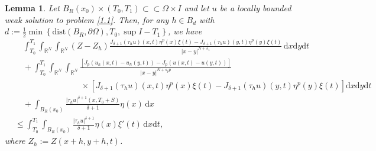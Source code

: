 \documentclass[reqno,10pt]{amsart}
\numberwithin{equation}{section}
\newtheorem{lemma}[theorem]{Lemma}
\begin{document}
\begin{lemma}
	\label{lem3}
	Let $B_R(x_0)\times(T_0,T_1)\subset\subset\Omega\times I$ and let $u$ be a locally bounded weak solution to problem \eqref{1.1}. Then, for any $h\in B_d$ with $d:=\frac{1}{2}\min\left\lbrace \mathrm{dist}(B_R,\partial\Omega), T_0, \sup I-T_1\right\rbrace$, we have
	\begin{align}
		\label{3.0}
		&\quad\int_{T_0}^{T_1}\int_{\mathbb{R}^N}\int_{\mathbb{R}^N}(Z-Z_h)\frac{J_{\delta+1}(\tau_hu)(x,t)\eta^p(x)\xi(t)-J_{\delta+1}(\tau_hu)(y,t)\eta^p(y)\xi(t)}{|x-y|^{N+s_1}}\,\mathrm{d}x\mathrm{d}y\mathrm{d}t\nonumber\\
		&\quad+\int_{T_0}^{T_1}\int_{\mathbb{R}^N}\int_{\mathbb{R}^N}\frac{\left[ J_{p}\left(u_h(x,t)-u_h(y,t)\right)-J_{p}\left(u(x,t)-u(y,t)\right)\right] }{|x-y|^{N+s_pp}}\nonumber\\
		&\qquad\qquad\qquad\qquad\times\left[ J_{\delta+1}(\tau_hu)(x,t)\eta^p(x)\xi(t)-J_{\delta+1}(\tau_hu)(y,t)\eta^p(y)\xi(t)\right]\mathrm{d}x\mathrm{d}y\mathrm{d}t\nonumber\\
		&\quad+\int_{B_R(x_0)}\frac{|\tau_hu|^{\delta+1}(x,T_0+S)}{\delta+1}\eta(x)\,\mathrm{d}x\nonumber\\
		&\le \int_{T_0}^{T_1}\int_{B_R(x_0)}\frac{|\tau_hu|^{\delta+1}}{\delta+1}\eta(x)\xi'(t)\,\mathrm{d}x\mathrm{d}t,
	\end{align}
	where $Z_h:=Z(x+h,y+h, t)$.
\end{lemma}
\end{document}
